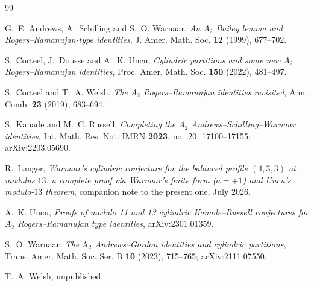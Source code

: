 \documentclass[11pt]{article}
\begin{document}
\begin{thebibliography}{99}

G.~E. Andrews, A.~Schilling and S.~O. Warnaar,
\textit{An $A_2$ Bailey lemma and Rogers--Ramanujan-type identities},
J. Amer. Math. Soc. \textbf{12} (1999), 677--702.

S.~Corteel, J.~Dousse and A.~K. Uncu,
\textit{Cylindric partitions and some new $A_2$ Rogers--Ramanujan
identities},
Proc. Amer. Math. Soc. \textbf{150} (2022), 481--497.

S.~Corteel and T.~A. Welsh,
\textit{The $A_2$ Rogers--Ramanujan identities revisited},
Ann. Comb. \textbf{23} (2019), 683--694.

S.~Kanade and M.~C. Russell,
\textit{Completing the $A_2$ Andrews--Schilling--Warnaar identities},
Int. Math. Res. Not. IMRN \textbf{2023}, no.~20, 17100--17155;
arXiv:2203.05690.

R.~Langer,
\textit{Warnaar's cylindric conjecture for the balanced profile
$(4,3,3)$ at modulus $13$: a complete proof via Warnaar's finite form
($a=+1$) and Uncu's modulo-$13$ theorem},
companion note to the present one, July 2026.

A.~K. Uncu,
\textit{Proofs of modulo 11 and 13 cylindric Kanade--Russell conjectures
for $A_2$ Rogers--Ramanujan type identities},
arXiv:2301.01359.

S.~O. Warnaar,
\textit{The $\mathrm{A}_2$ Andrews--Gordon identities and cylindric
partitions},
Trans. Amer. Math. Soc. Ser. B \textbf{10} (2023), 715--765;
arXiv:2111.07550.

T.~A. Welsh, unpublished.

\end{thebibliography}
\end{document}

